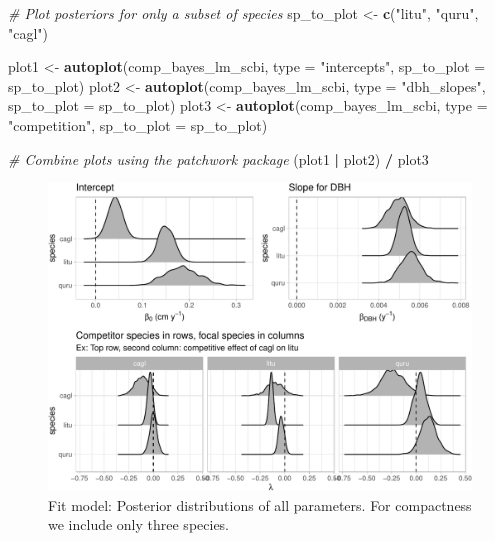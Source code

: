 \documentclass[12pt]{article}
\newenvironment{Shaded}{\begin{snugshade}}{\end{snugshade}}
\newcommand{\CommentTok}[1]{\textcolor[rgb]{0.56,0.35,0.01}{\textit{#1}}}
\newcommand{\DataTypeTok}[1]{\textcolor[rgb]{0.13,0.29,0.53}{#1}}
\newcommand{\KeywordTok}[1]{\textcolor[rgb]{0.13,0.29,0.53}{\textbf{#1}}}
\newcommand{\NormalTok}[1]{#1}
\newcommand{\OperatorTok}[1]{\textcolor[rgb]{0.81,0.36,0.00}{\textbf{#1}}}
\newcommand{\StringTok}[1]{\textcolor[rgb]{0.31,0.60,0.02}{#1}}
\begin{document}
\begin{Shaded}
\begin{Highlighting}[]
\CommentTok{# Plot posteriors for only a subset of species}
\NormalTok{sp_to_plot <-}\StringTok{ }\KeywordTok{c}\NormalTok{(}\StringTok{"litu"}\NormalTok{, }\StringTok{"quru"}\NormalTok{, }\StringTok{"cagl"}\NormalTok{)}

\NormalTok{plot1 <-}\StringTok{ }\KeywordTok{autoplot}\NormalTok{(comp_bayes_lm_scbi, }\DataTypeTok{type =} \StringTok{"intercepts"}\NormalTok{, }
                  \DataTypeTok{sp_to_plot =}\NormalTok{ sp_to_plot)}
\NormalTok{plot2 <-}\StringTok{ }\KeywordTok{autoplot}\NormalTok{(comp_bayes_lm_scbi, }\DataTypeTok{type =} \StringTok{"dbh_slopes"}\NormalTok{, }
                  \DataTypeTok{sp_to_plot =}\NormalTok{ sp_to_plot)}
\NormalTok{plot3 <-}\StringTok{ }\KeywordTok{autoplot}\NormalTok{(comp_bayes_lm_scbi, }\DataTypeTok{type =} \StringTok{"competition"}\NormalTok{, }
                  \DataTypeTok{sp_to_plot =}\NormalTok{ sp_to_plot)}

\CommentTok{# Combine plots using the patchwork package}
\NormalTok{(plot1 }\OperatorTok{|}\StringTok{ }\NormalTok{plot2) }\OperatorTok{/}\StringTok{ }\NormalTok{plot3}
\end{Highlighting}
\end{Shaded}

\begin{figure}

{\centering \includegraphics[width=1\linewidth]{Figures/scbi-posterior-viz-1} 

}

\caption{Fit model: Posterior distributions of all parameters. For compactness we include only three species.}\label{fig:scbi-posterior-viz}
\end{figure}
\end{document}
